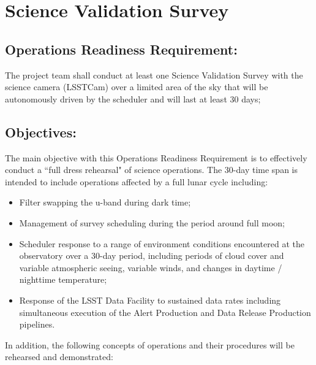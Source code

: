 \section{Science Validation Survey}  \label{sec:svs}

\subsection{Operations Readiness Requirement:}

The project team shall conduct at least one Science Validation Survey with the science camera (LSSTCam) over a limited area of the sky that will be autonomously driven by the scheduler and will last at least 30 days;

\subsection{Objectives:}

The main objective with this Operations Readiness Requirement is to effectively conduct a ``full dress rehearsal" of science operations.  The 30-day time span is intended to include operations affected by a full lunar cycle including:

\begin{itemize}
\item Filter swapping the u-band during dark time;
\item Management of survey scheduling during the period around full moon;
\item Scheduler response to a range of environment conditions encountered at the observatory over a 30-day period, including periods of cloud cover and variable atmospheric seeing, variable winds, and changes in daytime / nighttime temperature;
\item Response of the LSST Data Facility to sustained data rates including simultaneous execution of the Alert Production and Data Release Production pipelines.
\end{itemize}

In addition, the following concepts of operations and their procedures will be rehearsed and demonstrated:

